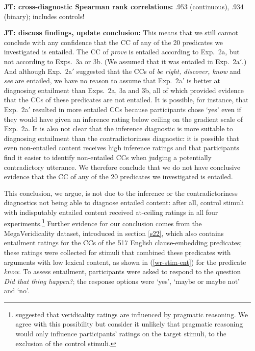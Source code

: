 \documentclass[11pt,fleqn]{article}
\newcommand{\6}{\mbox{$[\hspace*{-.6mm}[$}}
\newcommand{\9}{\mbox{$]\hspace*{-.6mm}]$}}
\newcommand{\jt}[1]{\textbf{\color{blue}JT: #1}}
\begin{document}
{\jt{cross-diagnostic Spearman rank correlations:} .953 (continuous), .934 (binary); includes controls!

\jt{discuss findings, update conclusion:} This means that we still cannot conclude with any confidence that the CC of any of the 20 predicates we investigated is entailed. The CC of {\em prove} is entailed according to Exp.~2a, but not according to Exps.~3a or 3b. (We assumed that it was entailed in Exp.~2a$'$.) And although Exp.~2a$'$ suggested that the CCs of {\em be right, discover, know} and {\em see} are entailed, we have no reason to assume that Exp.~2a$'$ is better at diagnosing entailment than Exps.~2a, 3a and 3b, all of which provided evidence that the CCs of these predicates are not entailed. It is possible, for instance, that Exp.~2a$'$ resulted in more entailed CCs because participants chose `yes' even if they would have given an inference rating below ceiling on the gradient scale of Exp.~2a. It is also not clear that the inference diagnostic is more suitable to diagnosing entailment than the contradictoriness diagnostic: it is possible that even non-entailed content receives high inference ratings and that participants find it easier to identify non-entailed CCs when judging a potentially contradictory utterance. We therefore conclude that we do not have conclusive evidence that the CC of any of the 20 predicates we investigated is entailed.

This conclusion, we argue, is not due to the inference or the contradictoriness diagnostics not being able to diagnose entailed content: after all, control stimuli with indisputably entailed content received at-ceiling ratings in all four experiments.\footnote{\citet[329]{demarneffe-etal2012} suggested that veridicality ratings are influenced by pragmatic reasoning. We agree with this possibility but consider it unlikely that pragmatic reasoning would only influence participants' ratings on the target stimuli, to the exclusion of the control stimuli.} Further evidence for our conclusion comes from the MegaVeridicality dataset, introduced in section \ref{s22}, which also contains entailment ratings for the CCs of the 517 English clause-embedding predicates; these ratings were collected for stimuli that combined these predicates with arguments with low lexical content, as shown in (\ref{wr-stim-ent}) for the predicate {\em know}. To assess entailment, participants were asked to respond to the question {\em Did that thing happen?}; the response options were `yes', `maybe or maybe not' and `no'. 

}
\end{document}
